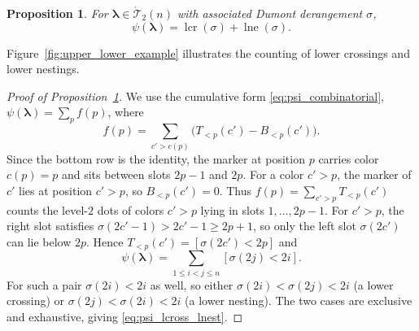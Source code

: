 \documentclass[10pt,a4paper]{amsart}
\numberwithin{equation}{section}
\newtheorem{Proposition}[Theorem]{Proposition}
\theoremstyle{definition}
\begin{document}
\begin{Proposition}
	\label{prop:psi_crossings_nestings}
	For $\boldsymbol\lambda\in\mathring{\mathcal{T}}_2(n)$ with associated
	Dumont derangement $\sigma$,
	\begin{equation}
		\label{eq:psi_lcross_lnest}
		\psi(\boldsymbol\lambda)=
		\operatorname{lcr}(\sigma)+\operatorname{lne}(\sigma).
	\end{equation}
\end{Proposition}
Figure~\ref{fig:upper_lower_example} illustrates the counting of lower
crossings and lower nestings.
\begin{proof}[Proof of Proposition~\ref{prop:psi_crossings_nestings}]
	We use the cumulative form \eqref{eq:psi_combinatorial},
	$\psi(\boldsymbol\lambda)=\sum_p f(p)$, where
	\[
		f(p)=\sum_{c'>c(p)}\bigl(T_{<p}(c')-B_{<p}(c')\bigr).
	\]
	Since the bottom row is the identity, the marker at position $p$
	carries color $c(p)=p$ and sits between slots $2p-1$ and $2p$. For a
	color $c'>p$, the marker of $c'$ lies at position $c'>p$, so
	$B_{<p}(c')=0$.
	Thus $f(p)=\sum_{c'>p}T_{<p}(c')$ counts the level-$2$ dots of colors
	$c'>p$ lying in slots $1,\dots,2p-1$.
	For $c'>p$, the right slot satisfies $\sigma(2c'-1)>2c'-1\ge 2p+1$, so
	only the left slot $\sigma(2c')$ can lie below $2p$. Hence
	$T_{<p}(c')= [ \sigma(2c')<2p ]$ and
	\begin{equation*}
		\psi(\boldsymbol\lambda)
		=\sum_{1\le i<j\le n} [ \sigma(2j)<2i ].
	\end{equation*}
	For such a pair $\sigma(2i)<2i$ as well, so either
	$\sigma(2i)<\sigma(2j)<2i$ (a lower crossing) or
	$\sigma(2j)<\sigma(2i)<2i$ (a lower nesting). The two cases are
	exclusive and exhaustive, giving \eqref{eq:psi_lcross_lnest}.
\end{proof}
\end{document}
